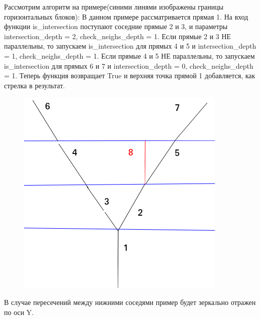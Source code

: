 Рассмотрим алгоритм на примере(синими линями изображены границы горизонтальных блоков): 
\newline
В данном примере рассматривается прямая 1. \newline На вход функции is\_intersection поступают соседние прямые 2 и 3, и параметры intersection\_depth = 2, check\_neighs\_depth = 1.
\newline
Если прямые 2 и 3 НЕ параллельны, то запускаем is\_intersection для прямых 4 и 5 и intersection\_depth = 1, check\_neighs\_depth = 1.
\newline
Если прямые 4 и 5 НЕ параллельны, то запускаем  is\_intersection для прямых 6 и 7 и intersection\_depth = 0, check\_neighs\_depth = 1. Теперь функция возвращает True и верхняя точка прямой 1 добавляется, как стрелка в результат.
\begin{figure}[!h]
	\centering
	\includegraphics[width=0.7\linewidth]{pictures/intersection_example}
	\caption[Intersection]{}
	\label{fig:intersectionexample}
\end{figure}

В случае пересечений между нижними соседями пример будет зеркально отражен по оси Y.

